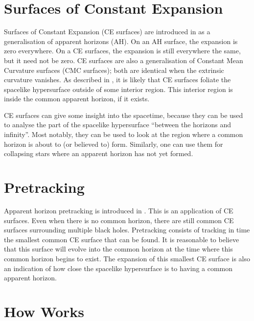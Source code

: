 
\section{Surfaces of Constant Expansion}

Surfaces of Constant Expansion (CE surfaces) are introduced in
\cite{AHFinderDirect/Schnetter03a} as a generalisation of
apparent horizons (AH).  On an AH surface, the expansion is zero
everywhere.  On a CE surfaces, the expansion is still everywhere the
same, but it need not be zero.  CE surfaces are also a generalisation
of Constant Mean Curvature surfaces (CMC surfaces); both are identical
when the extrinsic curvature vanishes.  As described in
\cite{AHFinderDirect/Schnetter03a}, it is likely that CE
surfaces foliate the spacelike hypersurface outside of some interior
region.  This interior region is inside the common apparent horizon,
if it exists.

CE surfaces can give some insight into the spacetime, because they can
be used to analyse the part of the spacelike hypersurface ``between
the horizons and infinity''.  Most notably, they can be used to look
at the region where a common horizon is about to (or believed to)
form.  Similarly, one can use them for collapsing stars where an
apparent horizon has not yet formed.


\section{Pretracking}

Apparent horizon pretracking is introduced in
\cite{AHFinderDirect/Schnetter03a}.  This is an application
of CE surfaces.  Even when there is no common horizon, there are still
common CE surfaces surrounding multiple black holes.  Pretracking
consists of tracking in time the smallest common CE surface that can
be found.  It is reasonable to believe that this surface will evolve
into the common horizon at the time where this common horizon begins
to exist.  The expansion of this smallest CE surface is also an
indication of how close the spacelike hypersurface is to having a
common apparent horizon.


\section{How  Works}
\label{AHFinderDirect/sect-how-ahfinderdirect-works}

